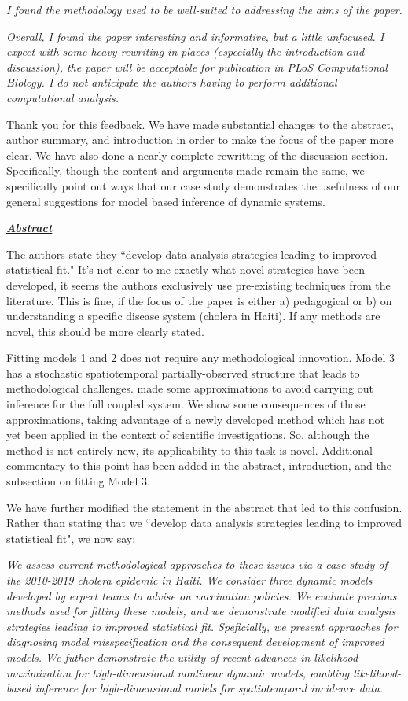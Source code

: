 \documentclass[11pt]{article}
\newcommand\report[1]{{\color{mygreen} \vspace{1mm}\hspace{0.25in}\parbox{6in}{\em #1}}}
\newcommand\article[1]{{\color{blue} \vspace{1mm}\hspace{0.25in}\parbox{6in}{\em #1}}}
\begin{document}
\report{
  I found the methodology used to be well-suited to addressing the aims of the paper.
}

\report{
  Overall, I found the paper interesting and informative, but a little unfocused. I expect with some heavy rewriting in places (especially the introduction and discussion), the paper will be acceptable for publication in PLoS Computational Biology. I do not anticipate the authors having to perform additional computational analysis.
}

Thank you for this feedback.
We have made substantial changes to the abstract, author summary, and introduction in order to make the focus of the paper more clear.
We have also done a nearly complete rewritting of the discussion section.
Specifically, though the content and arguments made remain the same, we specifically point out ways that our case study demonstrates the usefulness of our general suggestions for model based inference of dynamic systems.

\report{
  \textbf{\underline{Abstract}}

  The authors state they ``develop data analysis strategies leading to improved statistical fit." It's not clear to me exactly what novel strategies have been developed, it seems the authors exclusively use pre-existing techniques from the literature. This is fine, if the focus of the paper is either a) pedagogical or b) on understanding a specific disease system (cholera in Haiti). If any methods are novel, this should be more clearly stated.
}

Fitting models 1 and 2 does not require any methodological innovation. Model 3 has a stochastic spatiotemporal partially-observed structure that leads to methodological challenges. \cite{lee20} made some approximations to avoid carrying out inference for the full coupled system. We show some consequences of those approximations, taking advantage of a newly developed method which has not yet been applied in the context of scientific investigations. So, although the method is not entirely new, its applicability to this task is novel.
Additional commentary to this point has been added in the abstract, introduction, and the subsection on fitting Model 3.

We have further modified the statement in the abstract that led to this confusion. Rather than stating that we ``develop data analysis strategies leading to improved statistical fit", we now say:

\article{We assess current methodological approaches to these issues via a case study of the 2010-2019 cholera epidemic in Haiti. We consider three dynamic models developed by expert teams to advise on vaccination policies. We evaluate previous methods used for fitting these models, and we demonstrate modified data analysis strategies leading to improved statistical fit. Speficially, we present appraoches for diagnosing model misspecification and the consequent development of improved models. We futher demonstrate the utility of recent advances in likelihood maximization for high-dimensional nonlinear dynamic models, enabling likelihood-based inference for high-dimensional models for spatiotemporal incidence data.}
\end{document}
